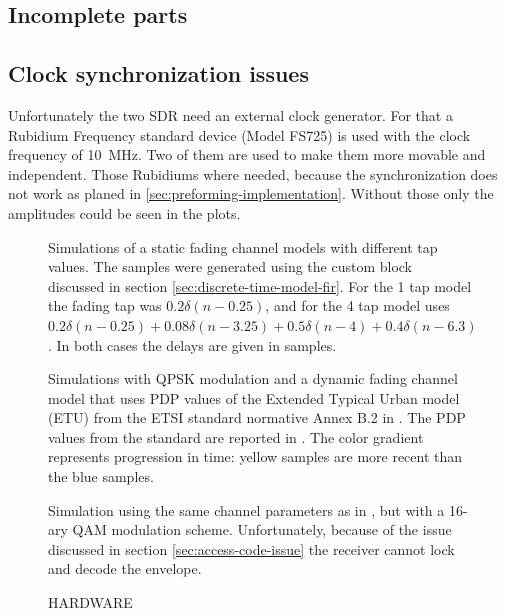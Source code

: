 \subsection{Incomplete parts}

\subsection{Clock synchronization issues}

Unfortunately the two SDR need an external clock generator. For that a Rubidium Frequency standard device (Model FS725) is used with the clock frequency of \SI{10}{\mega\hertz}. Two of them are used to make them more movable and independent. Those Rubidiums where needed, because the synchronization does not work as planed in \ref{sec:preforming-implementation}. 
Without those only the amplitudes could be seen in the plots. 



\begin{figure}
	\centering
	\label{fig:qpsk-simulations-static}
	
	\caption{
		Simulations of a static fading channel models with different tap values. The samples were generated using the custom block discussed in section \ref{sec:discrete-time-model-fir}. For the 1 tap model the fading tap was \(0.2\delta(n - 0.25)\), and for the 4 tap model uses \(0.2 \delta(n - 0.25) + 0.08 \delta(n - 3.25) + 0.5 \delta(n - 4) + 0.4 \delta(n - 6.3)\). In both cases the delays are given in samples.
	}
\end{figure}
\newpage
\begin{figure}
	\centering
	
	\caption{
		Simulations with QPSK modulation and a dynamic fading channel model that uses PDP values of the Extended Typical Urban model (ETU) from the ETSI standard normative Annex B.2 in \cite{ETSI}. The PDP values from the standard are reported in . The color gradient represents progression in time: yellow samples are more recent than the blue samples.
		\label{fig:qpsk-simulations-dynamic}
	}
\end{figure}
\newpage
\begin{figure}
	\centering
	
	\caption{
		Simulation using the same channel parameters as in , but with a 16-ary QAM modulation scheme. Unfortunately, because of the issue discussed in section \ref{sec:access-code-issue} the receiver cannot lock and decode the envelope.
	}
\end{figure}
\begin{figure}
	\centering
	
	\caption{
		HARDWARE
	}
\end{figure}
\newpage
\restoregeometry
